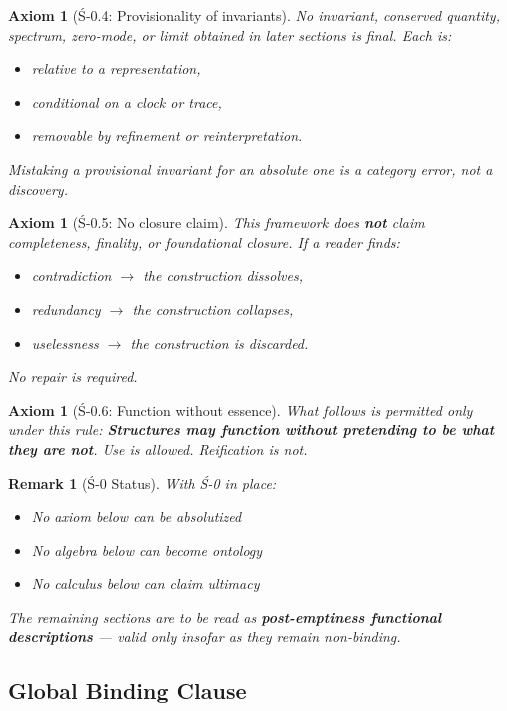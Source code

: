 \documentclass[12pt, oneside]{article}
\newtheorem{axiom}[theorem]{Axiom}
\newtheorem{remark}[theorem]{Remark}
\begin{document}
\begin{axiom}[Ś-0.4: Provisionality of invariants]
No invariant, conserved quantity, spectrum, zero-mode, or limit obtained in later sections is final. Each is:
\begin{itemize}
    \item relative to a representation,
    \item conditional on a clock or trace,
    \item removable by refinement or reinterpretation.
\end{itemize}
Mistaking a provisional invariant for an absolute one is a category error, not a discovery.
\end{axiom}

\begin{axiom}[Ś-0.5: No closure claim]
This framework does \textbf{not} claim completeness, finality, or foundational closure. If a reader finds:
\begin{itemize}
    \item contradiction $\rightarrow$ the construction dissolves,
    \item redundancy $\rightarrow$ the construction collapses,
    \item uselessness $\rightarrow$ the construction is discarded.
\end{itemize}
No repair is required.
\end{axiom}

\begin{axiom}[Ś-0.6: Function without essence]
What follows is permitted only under this rule: \textbf{Structures may function without pretending to be what they are not}. Use is allowed. Reification is not.
\end{axiom}

\begin{remark}[Ś-0 Status]
With Ś-0 in place:
\begin{itemize}
    \item No axiom below can be absolutized
    \item No algebra below can become ontology
    \item No calculus below can claim ultimacy
\end{itemize}
The remaining sections are to be read as \textbf{post-emptiness functional descriptions} — valid only insofar as they remain non-binding.
\end{remark}

\subsection{Global Binding Clause}
\end{document}
